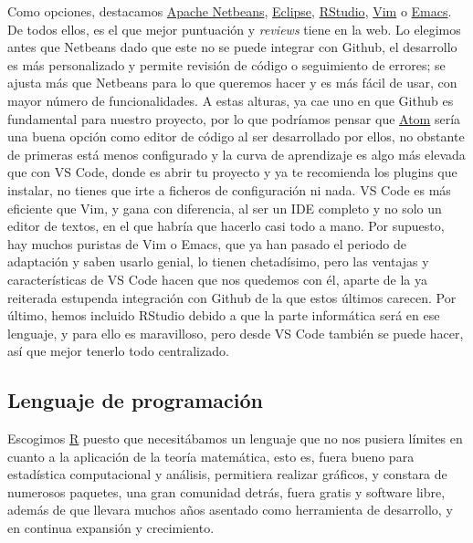 Como opciones, destacamos \href{https://netbeans.apache.org/}{Apache Netbeans}, 
\href{https://www.eclipse.org/downloads/}{Eclipse}, \href{https://www.rstudio.com/}{RStudio}, \href{https://www.vim.org/}{Vim} o 
\href{https://www.gnu.org/s/emacs/}{Emacs}. De todos ellos, es el que mejor puntuación y \textit{reviews} tiene 
en la web. Lo elegimos antes que Netbeans dado que este no se puede integrar con Github, el desarrollo es más 
personalizado y permite revisión de código o seguimiento de errores; se ajusta más que Netbeans para lo que 
queremos hacer y es más fácil de usar, con mayor número de funcionalidades. A estas alturas, ya cae uno en que 
Github es fundamental para nuestro proyecto, por lo que podríamos pensar que \href{https://atom.io/docs}{Atom} sería 
una buena opción como editor de código al ser desarrollado por ellos, no obstante de primeras está menos configurado 
y la curva de aprendizaje es algo más elevada que con VS Code, donde es abrir tu proyecto y ya te recomienda los 
plugins que instalar, no tienes que irte a ficheros de configuración ni nada. VS Code es más eficiente que Vim, y 
gana con diferencia, al ser un IDE completo y no solo un editor de textos, en el que habría que hacerlo casi 
todo a mano. Por supuesto, hay muchos puristas de Vim o Emacs, que ya han pasado el periodo de adaptación y saben 
usarlo genial, lo tienen chetadísimo, pero las ventajas y características de VS Code hacen que nos quedemos 
con él, aparte de la ya reiterada estupenda integración con Github de la que estos últimos carecen. Por último, 
hemos incluido RStudio debido a que la parte informática será en ese lenguaje, y para ello es maravilloso, pero 
desde VS Code también se puede hacer, así que mejor tenerlo todo centralizado.

\subsection{Lenguaje de programación}
Escogimos \href{https://www.r-project.org/}{R} puesto que necesitábamos un lenguaje que no nos pusiera límites 
en cuanto a la aplicación de la teoría matemática, esto es, fuera bueno para estadística computacional y 
análisis, permitiera realizar gráficos, y constara de numerosos paquetes, una gran comunidad detrás, 
fuera gratis y software libre, además de que llevara muchos años asentado como herramienta de desarrollo, y en 
continua expansión y crecimiento.

